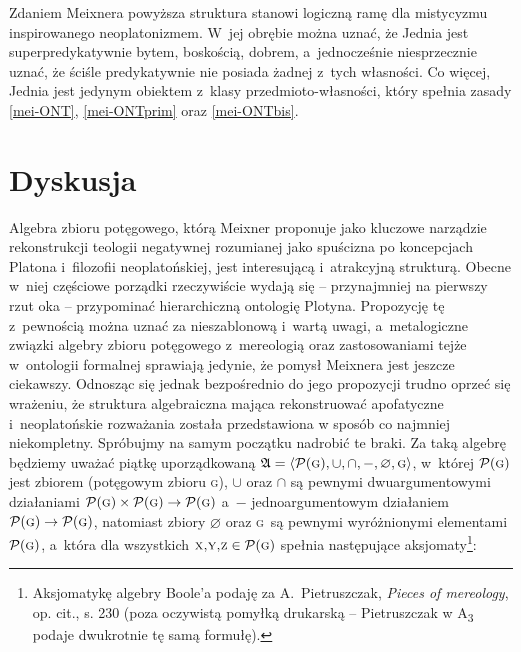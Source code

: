 Zdaniem Meixnera powyższa struktura stanowi logiczną ramę dla mistycyzmu inspirowanego neoplatonizmem. W~jej obrębie można uznać, że Jednia jest superpredykatywnie bytem, boskością, dobrem, a~jednocześnie niesprzecznie uznać, że ściśle predykatywnie nie posiada żadnej z~tych własności. Co więcej, Jednia jest jedynym obiektem z~klasy przedmioto-własności, który spełnia zasady \ref{mei-ONT}, \ref{mei-ONTprim} oraz \ref{mei-ONTbis}.

\section{Dyskusja}

Algebra zbioru potęgowego, którą Meixner proponuje jako kluczowe narządzie rekonstrukcji teologii negatywnej rozumianej jako spuścizna po koncepcjach Platona i~filozofii neoplatońskiej, jest interesującą i~atrakcyjną strukturą. Obecne w~niej częściowe porządki rzeczywiście wydają się -- przynajmniej na pierwszy rzut oka -- przypominać hierarchiczną ontologię Plotyna. Propozycję tę z~pewnością można uznać za nieszablonową i~wartą uwagi, a~metalogiczne związki algebry zbioru potęgowego z~mereologią oraz zastosowaniami tejże w~ontologii formalnej sprawiają jedynie, że pomysł Meixnera jest jeszcze ciekawszy. Odnosząc się jednak bezpośrednio do jego propozycji trudno oprzeć się wrażeniu, że struktura algebraiczna mająca rekonstruować apofatyczne i~neoplatońskie rozważania została przedstawiona w sposób co najmniej niekompletny. Spróbujmy na samym początku nadrobić te braki. Za taką algebrę będziemy uważać piątkę uporządkowaną $\mathfrak{A} = \langle \mathcal{P}(\textsc{g}), \cup, \cap, -, \varnothing, \textsc{g}\rangle$, w~której $\mathcal{P}(\textsc{g})$ jest zbiorem (potęgowym zbioru \textsc{g}), $\cup$ oraz $\cap$ są pewnymi dwuargumentowymi działaniami $\mathcal{P}(\textsc{g}) \times \mathcal{P}(\textsc{g}) \to \mathcal{P}(\textsc{g})$ a~$-$ jednoargumentowym działaniem $\mathcal{P}(\textsc{g}) \to \mathcal{P}(\textsc{g})$, natomiast zbiory $\varnothing$ oraz \textsc{g}~są pewnymi wyróżnionymi elementami $\mathcal{P}(\textsc{g})$, a~która dla wszystkich $\textsc{x,y,z}\in\mathcal{P}(\textsc{g})$ spełnia następujące aksjomaty\footnote{Aksjomatykę algebry Boole'a podaję za A.~Pietruszczak, \textit{Pieces of mereology}, op. cit., s. 230 (poza oczywistą pomyłką drukarską -- Pietruszczak w A\textsubscript{3} podaje dwukrotnie tę samą formułę).}:

